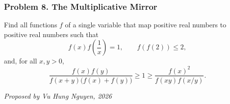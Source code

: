\subsubsection*{Problem 8. The Multiplicative Mirror}

\begin{exercisebox}[medium]

Find all functions $f$ of a single variable that map
positive real numbers to positive real numbers such that
\[
f(x)f\left(\frac1x\right)=1,
\qquad f(f(2))\le 2,
\]
and, for all $x,y>0$,
\[
\frac{f(x)f(y)}
{f(x+y)\bigl(f(x)+f(y)\bigr)}
\ge 1 \ge
\frac{f(x)^2}{f(xy)f(x/y)}.
\]

\begin{flushright}
\textit{Proposed by Vu Hung Nguyen, 2026}
\end{flushright}


\end{exercisebox}
